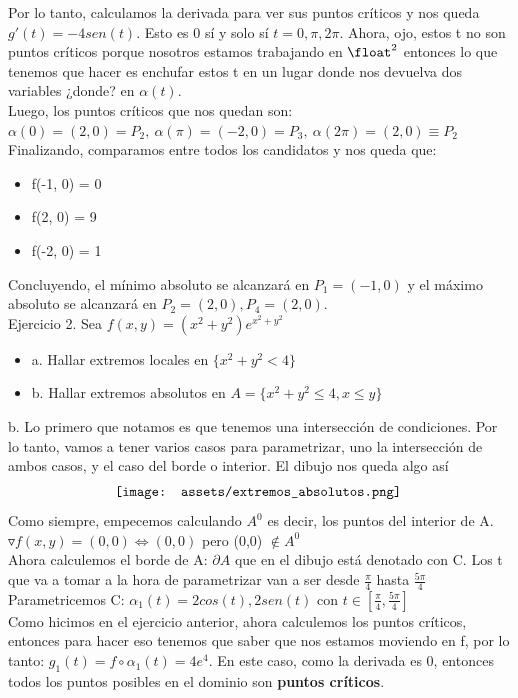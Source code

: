 \documentclass[10pt,a4paper]{article}
\begin{document}
Por lo tanto, calculamos la derivada para ver sus puntos críticos y nos queda $g'(t) = -4sen(t)$. Esto es 0 sí y solo sí $t=0, \pi, 2\pi$. Ahora, ojo, estos t no son puntos críticos porque nosotros estamos trabajando en $\float^{2}$ entonces lo que tenemos que hacer es enchufar estos t en un lugar donde nos devuelva dos variables ¿donde? en $\alpha(t)$. \\
Luego, los puntos críticos que nos quedan son: $ \alpha(0) = (2,0) = P_{2}, \ \alpha(\pi) = (-2,0) = P_{3}, \ \alpha(2\pi) = (2,0) \equiv P_{2}$ \\
Finalizando, comparamos entre todos los candidatos y nos queda que:
\begin{itemize}
    \item f(-1, 0) = 0
    \item f(2, 0) = 9
    \item f(-2, 0) = 1
\end{itemize}
Concluyendo, el mínimo absoluto se alcanzará en $P_{1} = (-1, 0)$ y el máximo absoluto se alcanzará en $P_{2} = (2,0), P_{4} = (2,0)$. \\
Ejercicio 2. Sea $f(x,y) = (x^{2} + y^{2})e^{x^{2} + y^{2}}$ 
\begin{itemize}
    \item a. Hallar extremos locales en $\{x^{2} + y^{2} < 4\}$
    \item b. Hallar extremos absolutos en $A = \{x^{2} + y^{2} \le 4, x \le y\}$
\end{itemize}
b. Lo primero que notamos es que tenemos una intersección de condiciones. Por lo tanto, vamos a tener varios casos para parametrizar, uno la intersección de ambos casos, y el caso del borde o interior. El dibujo nos queda algo así
\[\begin{minipage}[b]{0.6\textwidth}
    \texttt{[image: assets/extremos\_absolutos.png]}
\end{minipage}\]
Como siempre, empecemos calculando $A^{0}$ es decir, los puntos del interior de A. \\
$\triangledown f(x,y) = (0, 0) \iff (0, 0)$ pero (0,0) $\notin A^{0}$ \\
Ahora calculemos el borde de A: $\partial A$ que en el dibujo está denotado con C. Los t que va a tomar a la hora de parametrizar van a ser desde $\frac{\pi}{4}$ hasta $\frac{5\pi}{4}$ \\
Parametricemos C: $\alpha_{1}(t) = 2cos(t), 2sen(t)$ con $ t \in [\frac{\pi}{4}, \frac{5\pi}{4}]$ \\
Como hicimos en el ejercicio anterior, ahora calculemos los puntos críticos, entonces para hacer eso tenemos que saber que nos estamos moviendo en f, por lo tanto: $g_{1}(t) = f \circ \alpha_{1}(t) = 4e^{4}$. En este caso, como la derivada es 0, entonces todos los puntos posibles en el dominio son \textbf{puntos críticos}. \\
\end{document}

